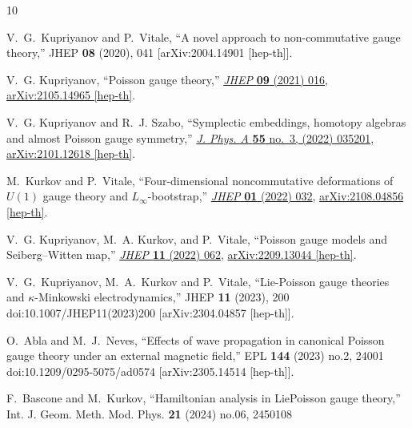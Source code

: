 \documentclass[12pt,a4paper]{article}
\numberwithin{equation}{section}
\theoremstyle{definition}
\begin{document}
{%
\begin{thebibliography}{10}

V.~G.~Kupriyanov and P.~Vitale,
``A novel approach to non-commutative gauge theory,''
JHEP \textbf{08} (2020), 041
[arXiv:2004.14901 [hep-th]].



V.~G. Kupriyanov, ``{Poisson gauge theory},''
  \href{http://dx.doi.org/10.1007/JHEP09(2021)016}{{\em JHEP} {\bfseries 09}
  (2021) 016}, \href{http://arxiv.org/abs/2105.14965}{{\ttfamily
  arXiv:2105.14965 [hep-th]}}.

V.~G. Kupriyanov and R.~J. Szabo, ``{Symplectic embeddings, homotopy algebras
  and almost Poisson gauge symmetry},''
  \href{http://dx.doi.org/10.1088/1751-8121/ac411c}{{\em J. Phys. A} {\bfseries
  55} no.~3, (2022) 035201}, \href{http://arxiv.org/abs/2101.12618}{{\ttfamily
  arXiv:2101.12618 [hep-th]}}.

M.~Kurkov and P.~Vitale, ``{Four-dimensional noncommutative deformations of
  $U(1)$ gauge theory and $L_{\infty}$-bootstrap},''
  \href{http://dx.doi.org/10.1007/JHEP01(2022)032}{{\em JHEP} {\bfseries 01}
  (2022) 032}, \href{http://arxiv.org/abs/2108.04856}{{\ttfamily
  arXiv:2108.04856 [hep-th]}}.

V.~G. Kupriyanov, M.~A. Kurkov, and P.~Vitale, ``{Poisson gauge models and
  Seiberg--Witten map},'' \href{http://dx.doi.org/10.1007/JHEP11(2022)062}{{\em
  JHEP} {\bfseries 11} (2022) 062},
  \href{http://arxiv.org/abs/2209.13044}{{\ttfamily arXiv:2209.13044
  [hep-th]}}.

V.~G.~Kupriyanov, M.~A.~Kurkov and P.~Vitale,
``Lie-Poisson gauge theories and \ensuremath{\kappa}-Minkowski electrodynamics,''
JHEP \textbf{11} (2023), 200
doi:10.1007/JHEP11(2023)200
[arXiv:2304.04857 [hep-th]].

O.~Abla and M.~J.~Neves,
``Effects of wave propagation in canonical Poisson gauge theory under an external magnetic field,''
EPL \textbf{144} (2023) no.2, 24001
doi:10.1209/0295-5075/ad0574
[arXiv:2305.14514 [hep-th]].

F.~Bascone and M.~Kurkov,
``Hamiltonian analysis in Lie{\textendash}Poisson gauge theory,''
Int. J. Geom. Meth. Mod. Phys. \textbf{21} (2024) no.06, 2450108


\end{thebibliography}}
\end{document}
